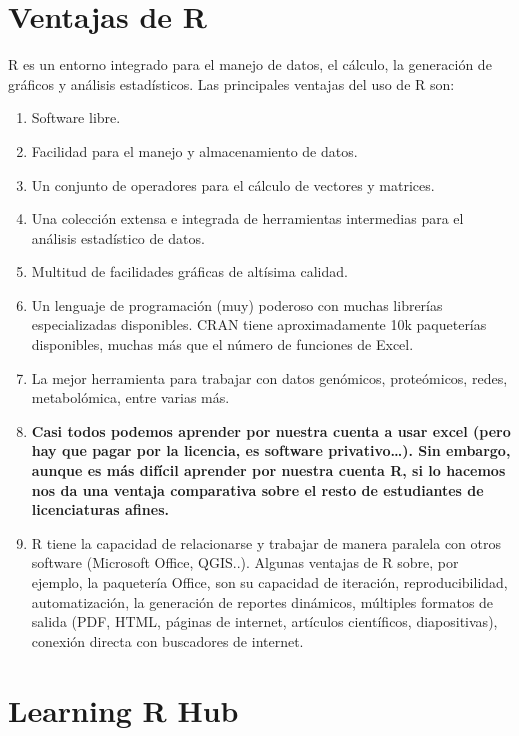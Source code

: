 \documentclass[
]{book}
\providecommand{\tightlist}{%
  \setlength{\itemsep}{0pt}\setlength{\parskip}{0pt}}
\begin{document}
\section{Ventajas de R}\label{ventajas-de-r}

R es un entorno integrado para el manejo de datos, el cálculo, la generación de gráficos y análisis estadísticos. Las principales ventajas del uso de R son:

\begin{enumerate}
\def\labelenumi{\arabic{enumi}.}
\tightlist
\item
  Software libre.
\item
  Facilidad para el manejo y almacenamiento de datos.
\item
  Un conjunto de operadores para el cálculo de vectores y matrices.
\item
  Una colección extensa e integrada de herramientas intermedias para el análisis estadístico de datos.
\item
  Multitud de facilidades gráficas de altísima calidad.
\item
  Un lenguaje de programación (muy) poderoso con muchas librerías especializadas disponibles. CRAN tiene aproximadamente 10k paqueterías disponibles, muchas más que el número de funciones de Excel.
\item
  La mejor herramienta para trabajar con datos genómicos, proteómicos, redes, metabolómica, entre varias más.
\item
  \textbf{Casi todos podemos aprender por nuestra cuenta a usar excel (pero hay que pagar por la licencia, es software privativo\ldots). Sin embargo, aunque es más difícil aprender por nuestra cuenta R, si lo hacemos nos da una ventaja comparativa sobre el resto de estudiantes de licenciaturas afines.}
\item
  R tiene la capacidad de relacionarse y trabajar de manera paralela con otros software (Microsoft Office, QGIS..). Algunas ventajas de R sobre, por ejemplo, la paquetería Office, son su capacidad de iteración, reproducibilidad, automatización, la generación de reportes dinámicos, múltiples formatos de salida (PDF, HTML, páginas de internet, artículos científicos, diapositivas), conexión directa con buscadores de internet.
\end{enumerate}

\section{Learning R Hub}\label{learning-r-hub}
\end{document}
